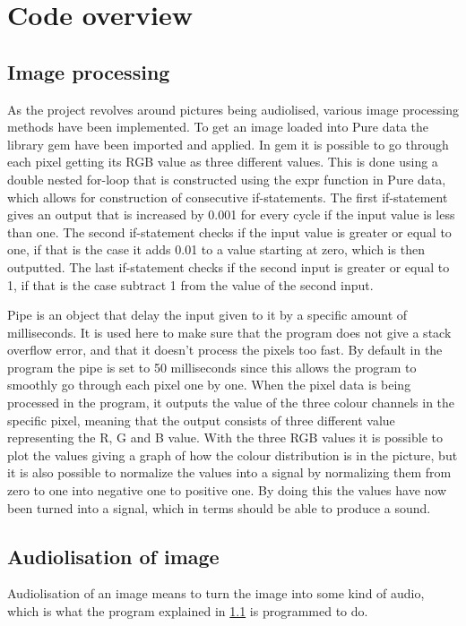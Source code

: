\section{Code overview}\label{sec:codeoverview}
	\subsection{Image processing}\label{sub:imageprocessing}
	As the project revolves around pictures being audiolised, various image processing methods have been implemented. To get an image loaded into Pure data the library gem have been imported and applied. In gem it is possible to go through each pixel getting its RGB value as three different values. This is done using a double nested for-loop that is constructed using the expr function in Pure data, which allows for construction of consecutive if-statements. The first if-statement gives an output that is increased by 0.001 for every cycle if the input value is less than one. The second if-statement checks if the input value is greater or equal to one, if that is the case it adds 0.01 to a value starting at zero, which is then outputted. The last if-statement checks if the second input is greater or equal to 1, if that is the case subtract 1 from the value of the second input.
	
	Pipe is an object that delay the input given to it by a specific amount of milliseconds. It is used here to make sure that the program does not give a stack overflow error, and that it doesn't process the pixels too fast. By default in the program the pipe is set to 50 milliseconds since this allows the program to smoothly go through each pixel one by one. 
	When the pixel data is being processed in the program, it outputs the value of the three colour channels in the specific pixel, meaning that the output consists of three different value representing the R, G and B value. With the three RGB values it is possible to plot the values giving a graph of how the colour distribution is in the picture, but it is also possible to normalize the values into a signal by normalizing them from zero to one into negative one to positive one. By doing this the values have now been turned into a signal, which in terms should be able to produce a sound.

	\subsection{Audiolisation of image}\label{sub:audiolisationofimage} 
	Audiolisation of an image means to turn the image into some kind of audio, which is what the program explained in \ref{sub:imageprocessing} is programmed to do. 

